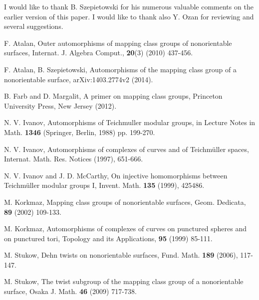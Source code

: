 \documentclass[11 pt]{amsart}
\theoremstyle{definition}
\begin{document}
I would like to thank B. Szepietowski for his numerous valuable
comments on the earlier version of this paper. I would like to thank
also  Y. Ozan for reviewing and several suggestions.

\bigskip
\providecommand{\bysame}{\leavevmode\hboxto3em{\hrulefill}\thinspace}
\begin{thebibliography}{1}

 F. Atalan, Outer automorphisms of mapping class groups of
nonorientable surfaces, Internat. J. Algebra Comput., {\bf 20}(3)
(2010) 437-456.

 F. Atalan, B. Szepietowski, Automorphisms of the mapping class group of a
nonorientable surface, arXiv:1403.2774v2 (2014).

 B. Farb and D. Margalit, A primer on mapping class groups,
Princeton University Press, New Jersey  (2012).

 N. V. Ivanov, Automorphisms of Teichmuller modular
groups, in Lecture Notes in Math. {\bf 1346} (Springer, Berlin,
1988) pp. 199-270.

 N. V. Ivanov, Automorphisms of complexes of curves and of Teichm\"uller spaces,
Internat. Math. Res. Notices  (1997), 651-666.

 N. V. Ivanov and J. D. McCarthy, On injective homomorphisms between
 Teichm\"uller modular groups I, Invent. Math. {\bf 135} (1999), 425486.

 M. Korkmaz, Mapping class groups of nonorientable surfaces, Geom.
Dedicata, {\bf 89} (2002) 109-133.

 M. Korkmaz, Automorphisms of complexes of curves on
punctured spheres and on punctured tori, Topology and its
Applications, {\bf 95} (1999) 85-111.

 M. Stukow, Dehn twists on nonorientable surfaces, Fund. Math.
{\bf 189} (2006), 117-147.

 M. Stukow, The twist subgroup of the mapping class group of
a nonorientable surface, Osaka J. Math. {\bf 46} (2009) 717-738.

\end{thebibliography}
\end{document}
